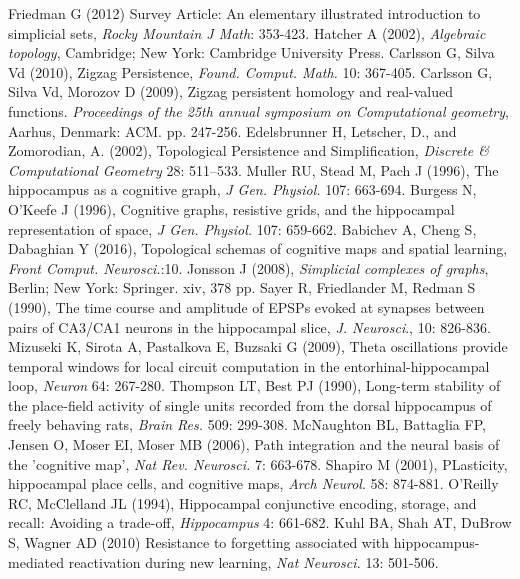 \documentclass[12pt,tightenlines]{revtex4}
\begin{document}
\begin{thebibliography}{99}
 Friedman G (2012) Survey Article: An elementary illustrated introduction to simplicial sets, \emph{Rocky Mountain J Math}: 353-423.
 Hatcher A (2002), \emph{Algebraic topology}, Cambridge; New York: Cambridge University Press.
 Carlsson G, Silva Vd (2010), Zigzag Persistence, \emph{Found. Comput. Math.} 10: 367-405.
 Carlsson G, Silva Vd, Morozov D (2009), Zigzag persistent homology and real-valued functions. \emph{Proceedings of the 25th annual symposium on Computational geometry}, Aarhus, Denmark: ACM. pp. 247-256.
 Edelsbrunner H, Letscher, D., and Zomorodian, A. (2002), Topological Persistence and Simplification, \emph{Discrete \& Computational Geometry} 28: 511--533.
 Muller RU, Stead M, Pach J (1996), The hippocampus as a cognitive graph, \emph{J Gen. Physiol.} 107: 663-694.
 Burgess N, O'Keefe J (1996), Cognitive graphs, resistive grids, and the hippocampal representation of space, \emph{J Gen. Physiol.} 107: 659-662.
 Babichev A, Cheng S, Dabaghian Y (2016), Topological schemas of cognitive maps and spatial learning, \emph{Front Comput. Neurosci.}:10.
 Jonsson J (2008), \emph{Simplicial complexes of graphs}, Berlin; New York: Springer. xiv, 378 pp.
 Sayer R, Friedlander M, Redman S (1990), The time course and amplitude of EPSPs evoked at synapses between pairs of CA3/CA1 neurons in the hippocampal slice, \emph{J. Neurosci}., 10: 826-836.
 Mizuseki K, Sirota A, Pastalkova E, Buzsaki G (2009), Theta oscillations provide temporal windows for local circuit computation in the entorhinal-hippocampal loop, \emph{Neuron} 64: 267-280.
 Thompson LT, Best PJ (1990), Long-term stability of the place-field activity of single units recorded from the dorsal hippocampus of freely behaving rats, \emph{Brain Res.} 509: 299-308.
 McNaughton BL, Battaglia FP, Jensen O, Moser EI, Moser MB (2006), Path integration and the neural basis of the 'cognitive map', \emph{Nat Rev. Neurosci.} 7: 663-678.
 Shapiro M (2001), PLasticity, hippocampal place cells, and cognitive maps, \emph{Arch Neurol}. 58: 874-881.
 O'Reilly RC, McClelland JL (1994), Hippocampal conjunctive encoding, storage, and recall: Avoiding a trade-off, \emph{Hippocampus} 4: 661-682.
 Kuhl BA, Shah AT, DuBrow S, Wagner AD (2010) Resistance to forgetting associated with hippocampus-mediated reactivation during new learning, \emph{Nat Neurosci.} 13: 501-506.

\end{thebibliography}
\end{document}
